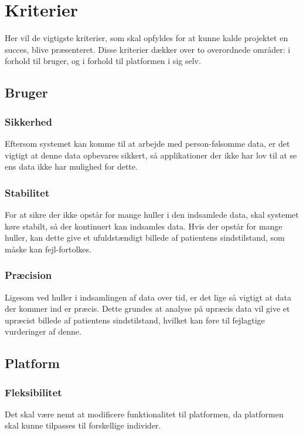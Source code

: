 \section{Kriterier}
Her vil de vigtigste kriterier, som skal opfyldes for at kunne kalde projektet en succes, blive præsenteret.
Disse kriterier dækker over to overordnede områder: i forhold til bruger, og i forhold til platformen i sig selv.

\subsection{Bruger}

\subsubsection{Sikkerhed}
Eftersom systemet kan komme til at arbejde med person-følsomme data, er det vigtigt at denne data opbevares sikkert, så applikationer der ikke har lov til at se ens data ikke har mulighed for dette.

\subsubsection{Stabilitet}
For at sikre der ikke opstår for mange huller i den indsamlede data, skal systemet køre stabilt, så der kontinuert kan indsamles data.
Hvis der opstår for mange huller, kan dette give et ufuldstændigt billede af patientens sindstilstand, som måske kan fejl-fortolkes.

\subsubsection{Præcision}
Ligesom ved huller i indsamlingen af data over tid, er det lige så vigtigt at data der kommer ind er præcis.
Dette grundes at analyse på upræcis data vil give et upræcist billede af patientens sindstilstand, hvilket kan føre til fejlagtige vurderinger af denne.

\subsection{Platform}

\subsubsection{Fleksibilitet}
Det skal være nemt at modificere funktionalitet til platformen, da platformen skal kunne tilpasses til forskellige individer.

